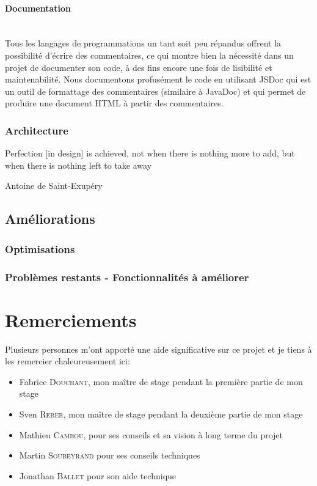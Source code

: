 \documentclass[a4paper,french,12pt]{article}
\begin{document}
	\paragraph{Documentation}~\\	
		Tous les langages de programmations un tant soit peu répandus offrent la possibilité d'écrire des commentaires, ce qui montre bien la nécessité dans un projet de documenter son code, à des fins encore une fois de lisibilité et maintenabilité.
		Nous documentons profusément le code en utilisant JSDoc qui est un outil de formattage des commentaires (similaire à JavaDoc) et qui permet de produire une document HTML à partir des commentaires.

	\subsubsection{Architecture}
	\epigraph{Perfection [in design] is achieved, not when there is nothing more to add, but when there is nothing left to take away}{Antoine de Saint-Exupéry}


  \subsection{Améliorations}
	\subsubsection{Optimisations}
   

    \subsubsection{Problèmes restants - Fonctionnalités à améliorer}
   


\section{Remerciements}

	Plusieurs personnes m’ont apporté une aide significative sur ce projet et je tiens à les remercier chaleureusement ici:

	\begin{itemize}
		\item Fabrice \textsc{Douchant}, mon maître de stage pendant la première partie de mon stage
		\item Sven \textsc{Reber}, mon maître de stage pendant la deuxième partie de mon stage
		\item Mathieu \textsc{Cambou}, pour ses conseils et sa vision à long terme du projet
		\item Martin \textsc{Soubeyrand} pour ses conseils techniques
		\item Jonathan \textsc{Ballet} pour son aide technique
	\end{itemize}
\end{document}
